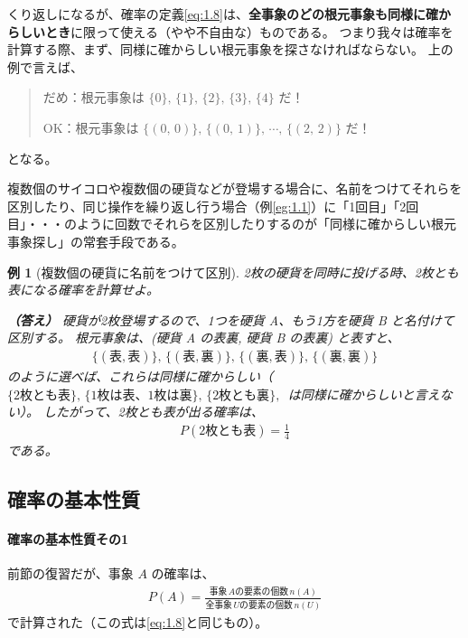 \documentclass[12pt]{ltjsarticle}\usepackage{ifthen}\newcounter{enlarge}\setcounter{enlarge}{1}
\newtheorem{eg}{例}
\begin{document}
くり返しになるが、確率の定義\eqref{eq:1.8}は、\textbf{全事象のどの根元事象も同様に確からしいとき}に限って使える（やや不自由な）ものである。
つまり我々は確率を計算する際、まず、同様に確からしい根元事象を探さなければならない。
上の例で言えば、
\begin{quotation}
  だめ：根元事象は $\{0\},\,\{1\},\,\{2\},\,\{3\},\,\{4\}$ だ！
  
  OK：根元事象は $\{(0,\, 0)\},\, \{(0,\, 1)\},\, \cdots ,\, \{(2,\,2)\}$ だ！
\end{quotation}
となる。

複数個のサイコロや複数個の硬貨などが登場する場合に、名前をつけてそれらを区別したり、同じ操作を繰り返し行う場合（例\ref{eg:1.1}）に「1回目」「2回目」・・・のように回数でそれらを区別したりするのが「同様に確からしい根元事象探し」の常套手段である。

\begin{eg}[複数個の硬貨に名前をつけて区別]
  2枚の硬貨を同時に投げる時、2枚とも表になる確率を計算せよ。

  \textbf{（答え）}
  硬貨が2枚登場するので、1つを硬貨 A、もう1方を硬貨 B と名付けて区別する。
  根元事象は、(硬貨 A の表裏, 硬貨 B の表裏) と表すと、
  \begin{align}
    \{(\text{表}, \text{表})\},\, \{(\text{表}, \text{裏})\},\, \{(\text{裏}, \text{表})\},\, \{(\text{裏}, \text{裏})\} \label{eq:1.11}
  \end{align}
  のように選べば、これらは同様に確からしい（$\{\text{2枚とも表}\},\, \{\text{1枚は表、1枚は裏}\},\, \{\text{2枚とも裏}\},\,$ は同様に確からしいと言えない）。
  したがって、2枚とも表が出る確率は、
  \begin{align}
    P(\text{2枚とも表}) = \frac{1}{4} \label{eq:1.12}
  \end{align}
  である。
\end{eg}

\subsection{確率の基本性質}

\paragraph{確率の基本性質その1}

前節の復習だが、事象 $A$ の確率は、
\begin{align}
    P(A) = \frac{\text{事象}\, A \text{の要素の個数}\, n(A)}{\text{全事象}\, U \text{の要素の個数} \,n(U)} \label{eq:1.13}
\end{align}
で計算された（この式は\eqref{eq:1.8}と同じもの）。
\end{document}

